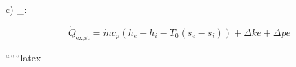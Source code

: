 c) \quad {}_{}: \quad {} \quad {} \quad {}

\[
\dot{Q}_{\text{ex,st}} = \dot{m}c_p \left( h_e - h_i - T_0 (s_e - s_i) \right) + \Delta ke + \Delta pe
\]

``````latex